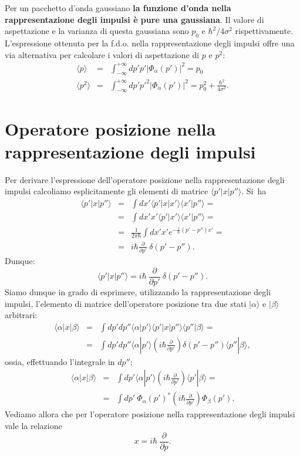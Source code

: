Per un pacchetto d'onda gaussiano \textbf{la funzione d'onda nella rappresentazione degli impulsi è pure una gaussiana}. Il valore di aspettazione e la varianza di questa gaussiana sono $p_0$ e $\hbar^2/4 \sigma^2$ rispettivamente.\\
L'espressione ottenuta per la f.d.o. nella rappresentazione degli impulsi offre una via alternativa per calcolare i valori di aspettazione di $p$ e $p^2$:
\begin{eqnarray}
\langle p \rangle &=& \int_{-\infty}^{+\infty} dp' p' |\Phi_\alpha(p')|^2 = p_0\\
\langle p^2 \rangle &=& \int_{-\infty}^{+\infty} dp' p'^2 |\Phi_\alpha(p')|^2 = p_0^2 + \frac{\hbar^2}{4 \sigma^2}.
\end{eqnarray}
\section{Operatore posizione nella rappresentazione degli impulsi}
Per derivare l'espressione dell'operatore posizione nella rappresentazione degli impulsi calcoliamo esplicitamente gli elementi di matrice $\langle p' | x | p'' \rangle$. Si~ha
\begin{eqnarray}
\langle p' | x | p'' \rangle &=& \int dx' \langle p' | x | x' \rangle \langle x' | p'' \rangle = \nonumber\\
&=& \int dx' x' \langle p' | x' \rangle \langle x' | p'' \rangle = \nonumber\\
&=& \frac{1}{2 \pi \hbar} \int dx' x' e^{-\frac{i}{\hbar} (p'-p'') x'} = \nonumber \\
&=& i \hbar \frac{\partial}{\partial p'} ~\delta(p' - p'').
\end{eqnarray}
Dunque:
\begin{equation}
\langle p' | x | p'' \rangle = i \hbar~ \frac{\partial}{\partial p'} ~\delta(p' - p'').
\end{equation}
Siamo dunque in grado di esprimere, utilizzando la rappresentazione degli impulsi, l'elemento di matrice dell'operatore posizione tra due stati $| \alpha \rangle$ e $| \beta \rangle$ arbitrari:
\begin{eqnarray}
\langle \alpha | x | \beta \rangle &=& \int dp' dp'' \langle \alpha | p' \rangle \langle p' | x | p'' \rangle \langle p'' | \beta \rangle = \nonumber \\
&=& \int dp' dp'' \langle \alpha | p' \rangle \left(i \hbar \frac{\partial}{\partial p'} \right) \delta(p'-p'') \langle p'' | \beta \rangle,
\end{eqnarray}
ossia, effettuando l'integrale in $dp''$:
\begin{eqnarray}
\langle \alpha | x | \beta \rangle &=& \int dp' \langle \alpha | p' \rangle \left(i \hbar \frac{\partial}{\partial p'} \right) \langle p' | \beta \rangle = \nonumber\\
&=& \int dp'~ \Phi_\alpha(p')^* \left(i \hbar \frac{\partial}{\partial p'} \right) \Phi_\beta(p').
\end{eqnarray}
Vediamo allora che per l'operatore posizione nella rappresentazione degli impulsi vale la relazione
\begin{equation}
x = i \hbar~ \frac{\partial}{\partial p} .
\end{equation}